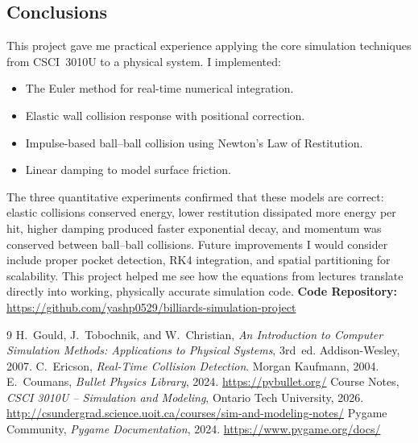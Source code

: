 \documentclass[12pt, letterpaper]{article}
\begin{document}
\subsection*{Conclusions}
This project gave me practical experience applying the core simulation
techniques from CSCI~3010U to a physical system.
I implemented:
\begin{itemize}[noitemsep]
  \item The Euler method for real-time numerical integration.
  \item Elastic wall collision response with positional correction.
  \item Impulse-based ball--ball collision using Newton's Law
        of Restitution.
  \item Linear damping to model surface friction.
\end{itemize}
The three quantitative experiments confirmed that these models
are correct: elastic collisions conserved energy,
lower restitution dissipated more energy per hit,
higher damping produced faster exponential decay,
and momentum was conserved between ball--ball collisions.
Future improvements I would consider include proper pocket detection,
RK4 integration, and spatial partitioning for scalability.
This project helped me see how the equations from lectures translate
directly into working, physically accurate simulation code.
\noindent\textbf{Code Repository:}
\url{https://github.com/yashp0529/billiards-simulation-project}
\begin{thebibliography}{9}
H.~Gould, J.~Tobochnik, and W.~Christian,
\textit{An Introduction to Computer Simulation Methods:
Applications to Physical Systems}, 3rd~ed.
Addison-Wesley, 2007.
C.~Ericson,
\textit{Real-Time Collision Detection}.
Morgan Kaufmann, 2004.
E.~Coumans,
\textit{Bullet Physics Library}, 2024.
\url{https://pybullet.org/}
Course Notes,
\textit{CSCI 3010U -- Simulation and Modeling},
Ontario Tech University, 2026.
\url{http://csundergrad.science.uoit.ca/courses/sim-and-modeling-notes/}
Pygame Community,
\textit{Pygame Documentation}, 2024.
\url{https://www.pygame.org/docs/}
\end{thebibliography}
\end{document}
